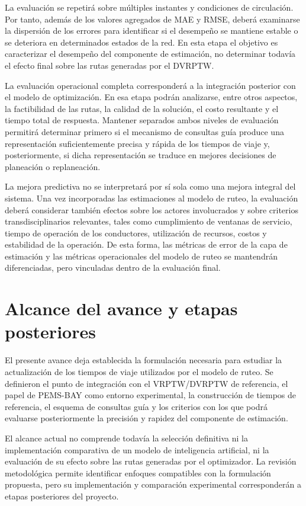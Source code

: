 \documentclass[11pt]{article}
\begin{document}
La evaluación se repetirá sobre múltiples instantes y condiciones de
circulación. Por tanto, además de los valores agregados de MAE y RMSE, deberá
examinarse la dispersión de los errores para identificar si el desempeño se
mantiene estable o se deteriora en determinados estados de la red. En esta
etapa el objetivo es caracterizar el desempeño del componente de estimación,
no determinar todavía el efecto final sobre las rutas generadas por el
DVRPTW.

La evaluación operacional completa corresponderá a la integración posterior
con el modelo de optimización. En esa etapa podrán analizarse, entre otros
aspectos, la factibilidad de las rutas, la calidad de la solución, el costo
resultante y el tiempo total de respuesta. Mantener separados ambos niveles de
evaluación permitirá determinar primero si el mecanismo de consultas guía
produce una representación suficientemente precisa y rápida de los tiempos de
viaje y, posteriormente, si dicha representación se traduce en mejores
decisiones de planeación o replaneación.

La mejora predictiva no se interpretará por sí sola como una mejora integral
del sistema. Una vez incorporadas las estimaciones al modelo de ruteo, la
evaluación deberá considerar también efectos sobre los actores involucrados y
sobre criterios transdisciplinarios relevantes, tales como cumplimiento de
ventanas de servicio, tiempo de operación de los conductores, utilización de
recursos, costos y estabilidad de la operación. De esta forma, las métricas de
error de la capa de estimación y las métricas operacionales del modelo de ruteo
se mantendrán diferenciadas, pero vinculadas dentro de la evaluación final.

\section{Alcance del avance y etapas posteriores}

El presente avance deja establecida la formulación necesaria para estudiar la
actualización de los tiempos de viaje utilizados por el modelo de ruteo. Se
definieron el punto de integración con el VRPTW/DVRPTW de referencia, el papel
de PEMS-BAY como entorno experimental, la construcción de tiempos de
referencia, el esquema de consultas guía y los criterios con los que podrá
evaluarse posteriormente la precisión y rapidez del componente de estimación.

El alcance actual no comprende todavía la selección definitiva ni la
implementación comparativa de un modelo de inteligencia artificial, ni la
evaluación de su efecto sobre las rutas generadas por el optimizador. La
revisión metodológica permite identificar enfoques compatibles con la
formulación propuesta, pero su implementación y comparación experimental
corresponderán a etapas posteriores del proyecto.
\end{document}
